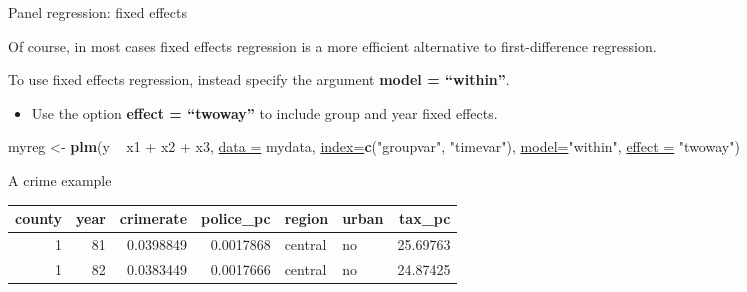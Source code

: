 \documentclass[ignorenonframetext,]{beamer}
\newenvironment{Shaded}{\begin{snugshade}}{\end{snugshade}}
\newcommand{\KeywordTok}[1]{\textcolor[rgb]{0.26,0.66,0.93}{\textbf{#1}}}
\newcommand{\DataTypeTok}[1]{\textcolor[rgb]{0.74,0.68,0.62}{\underline{#1}}}
\newcommand{\DecValTok}[1]{\textcolor[rgb]{0.27,0.67,0.26}{#1}}
\newcommand{\StringTok}[1]{\textcolor[rgb]{0.02,0.61,0.04}{#1}}
\newcommand{\OperatorTok}[1]{\textcolor[rgb]{0.74,0.68,0.62}{#1}}
\newcommand{\NormalTok}[1]{\textcolor[rgb]{0.74,0.68,0.62}{#1}}
\providecommand{\tightlist}{%
  \setlength{\itemsep}{0pt}\setlength{\parskip}{0pt}}
\begin{document}
\begin{frame}[fragile]{Panel regression: fixed effects}

Of course, in most cases fixed effects regression is a more efficient
alternative to first-difference regression.

To use fixed effects regression, instead specify the argument
\textbf{model = ``within''}.

\begin{itemize}
\tightlist
\item
  Use the option \textbf{effect = ``twoway''} to include group and year
  fixed effects.
\end{itemize}

\begin{Shaded}
\begin{Highlighting}[]
\NormalTok{myreg <-}\StringTok{ }\KeywordTok{plm}\NormalTok{(y }\OperatorTok{~}\StringTok{ }\NormalTok{x1 }\OperatorTok{+}\StringTok{ }\NormalTok{x2 }\OperatorTok{+}\StringTok{ }\NormalTok{x3, }\DataTypeTok{data =}\NormalTok{ mydata, }
             \DataTypeTok{index=}\KeywordTok{c}\NormalTok{(}\StringTok{"groupvar"}\NormalTok{, }\StringTok{"timevar"}\NormalTok{), }
             \DataTypeTok{model=}\StringTok{"within"}\NormalTok{, }\DataTypeTok{effect =} \StringTok{"twoway"}\NormalTok{)}
\end{Highlighting}
\end{Shaded}

\end{frame}

\begin{frame}[fragile]{A crime example}

\begin{Shaded}
\end{Shaded}

\begin{longtable}[]{@{}rrrrllr@{}}
\toprule
county & year & crimerate & police\_pc & region & urban &
tax\_pc\tabularnewline
\midrule
\endhead
1 & 81 & 0.0398849 & 0.0017868 & central & no & 25.69763\tabularnewline
1 & 82 & 0.0383449 & 0.0017666 & central & no & 24.87425\tabularnewline
\bottomrule
\end{longtable}

\end{frame}
\end{document}
